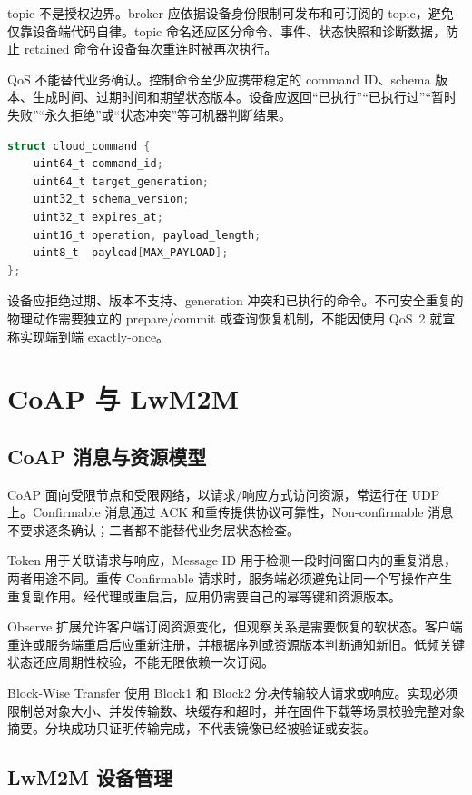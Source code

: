 topic 不是授权边界。broker 应依据设备身份限制可发布和可订阅的 topic，避免仅靠设备端代码自律。topic 命名还应区分命令、事件、状态快照和诊断数据，防止 retained 命令在设备每次重连时被再次执行。

QoS 不能替代业务确认。控制命令至少应携带稳定的 command ID、schema 版本、生成时间、过期时间和期望状态版本。设备应返回“已执行”“已执行过”“暂时失败”“永久拒绝”或“状态冲突”等可机器判断结果。

\begin{lstlisting}[language=C,caption={可重试 IoT 命令的抽象结构}]
struct cloud_command {
    uint64_t command_id;
    uint64_t target_generation;
    uint32_t schema_version;
    uint32_t expires_at;
    uint16_t operation, payload_length;
    uint8_t  payload[MAX_PAYLOAD];
};
\end{lstlisting}

设备应拒绝过期、版本不支持、generation 冲突和已执行的命令。不可安全重复的物理动作需要独立的 prepare/commit 或查询恢复机制，不能因使用 QoS~2 就宣称实现端到端 exactly-once。

\section{CoAP 与 LwM2M}

\subsection{CoAP 消息与资源模型}

CoAP 面向受限节点和受限网络，以请求/响应方式访问资源，常运行在 UDP 上\cite{rfc7252}。Confirmable 消息通过 ACK 和重传提供协议可靠性，Non-confirmable 消息不要求逐条确认；二者都不能替代业务层状态检查。

Token 用于关联请求与响应，Message ID 用于检测一段时间窗口内的重复消息，两者用途不同。重传 Confirmable 请求时，服务端必须避免让同一个写操作产生重复副作用。经代理或重启后，应用仍需要自己的幂等键和资源版本。

Observe 扩展允许客户端订阅资源变化，但观察关系是需要恢复的软状态\cite{rfc7641}。客户端重连或服务端重启后应重新注册，并根据序列或资源版本判断通知新旧。低频关键状态还应周期性校验，不能无限依赖一次订阅。

Block-Wise Transfer 使用 Block1 和 Block2 分块传输较大请求或响应\cite{rfc9177}。实现必须限制总对象大小、并发传输数、块缓存和超时，并在固件下载等场景校验完整对象摘要。分块成功只证明传输完成，不代表镜像已经被验证或安装。

\subsection{LwM2M 设备管理}

